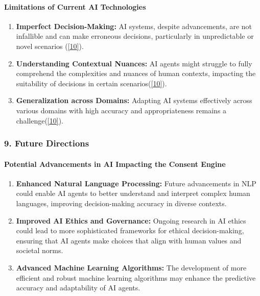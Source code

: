 \hypertarget{limitations-of-current-ai-technologies}{%
\paragraph{Limitations of Current AI
Technologies}\label{limitations-of-current-ai-technologies}}

\begin{enumerate}
\def\labelenumi{\arabic{enumi}.}
\item
  \textbf{Imperfect Decision-Making:} AI systems, despite advancements,
  are not infallible and can make erroneous decisions, particularly in
  unpredictable or novel scenarios (\protect\hyperlink{10}{{[}10{]}}).
\item
  \textbf{Understanding Contextual Nuances:} AI agents might struggle to
  fully comprehend the complexities and nuances of human contexts,
  impacting the suitability of decisions in certain
  scenarios(\protect\hyperlink{10}{{[}10{]}}).
\item
  \textbf{Generalization across Domains:} Adapting AI systems
  effectively across various domains with high accuracy and
  appropriateness remains a challenge(\protect\hyperlink{10}{{[}10{]}}).
\end{enumerate}

\hypertarget{future-directions}{%
\subsubsection{9. Future Directions}\label{future-directions}}

\hypertarget{potential-advancements-in-ai-impacting-the-consent-engine}{%
\paragraph{Potential Advancements in AI Impacting the Consent
Engine}\label{potential-advancements-in-ai-impacting-the-consent-engine}}

\begin{enumerate}
\def\labelenumi{\arabic{enumi}.}
\item
  \textbf{Enhanced Natural Language Processing:} Future advancements in
  NLP could enable AI agents to better understand and interpret complex
  human languages, improving decision-making accuracy in diverse
  contexts.
\item
  \textbf{Improved AI Ethics and Governance:} Ongoing research in AI
  ethics could lead to more sophisticated frameworks for ethical
  decision-making, ensuring that AI agents make choices that align with
  human values and societal norms.
\item
  \textbf{Advanced Machine Learning Algorithms:} The development of more
  efficient and robust machine learning algorithms may enhance the
  predictive accuracy and adaptability of AI agents.
\end{enumerate}

